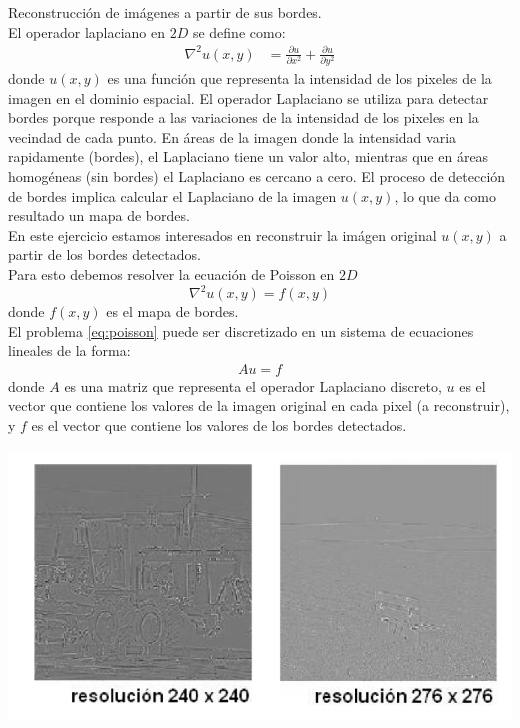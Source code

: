\begin{homeworkProblem}
  Reconstrucción de imágenes a partir de sus bordes.\\
  El operador laplaciano en $2D$ se define como:
  \begin{align*}
    \nabla^2 u(x,y)&=\frac{\partial u}{\partial x^2}+\frac{\partial u}{\partial y^2}
  \end{align*}
  donde $u(x,y)$ es una función que representa la intensidad de los pixeles de la imagen en el dominio espacial. El operador Laplaciano se utiliza para detectar bordes porque responde a las variaciones de la intensidad de los pixeles en la vecindad de cada punto. En áreas de la imagen donde la intensidad varia rapidamente (bordes), el Laplaciano tiene un valor alto, mientras que en áreas homogéneas (sin bordes) el Laplaciano es cercano a cero. El proceso de detección de bordes implica calcular el Laplaciano de la imagen $u(x,y)$, lo que da como resultado un mapa de bordes.\\
  En este ejercicio estamos interesados en reconstruir la imágen original $u(x,y)$ a partir de los bordes detectados.\\
  Para esto debemos resolver la ecuación de Poisson en $2D$
  \begin{equation}\label{eq:poisson}
    \nabla^2u(x,y)=f(x,y)
  \end{equation}
  donde $f(x,y)$ es el mapa de bordes.\\
  El problema \ref{eq:poisson} puede ser discretizado en un sistema de ecuaciones lineales de la forma:
  \begin{align*}
    Au=f
  \end{align*}
  donde $A$ es una matriz que representa el operador Laplaciano discreto, $u$ es el vector que contiene los valores de la imagen original en cada pixel (a reconstruir), y $f$ es el vector que contiene los valores de los bordes detectados.\\
  \begin{center}
    \includegraphics[scale=0.8]{Figures/imagenesproblema5.png}

\end{center}
\end{homeworkProblem}
